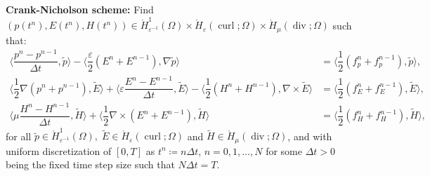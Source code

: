 \documentclass{amsart}
\theoremstyle{thmstyleone}%
\theoremstyle{thmstyletwo}%
\theoremstyle{thmstylethree}%
\DeclareMathOperator{\curl}{curl}
\def\divgn{\operatorname{div}}
\newcommand{\aInnerproduct}[2]{\bigl\langle #1, #2 \bigr\rangle}
\begin{document}
\smallskip \noindent \textbf{Crank-Nicholson scheme:} Find $(p(t^n), E(t^n), H(t^n)) \in \mathring{H}^1_{\varepsilon^{-1}}(\Omega) \times \mathring{H}_{\varepsilon}(\curl; \Omega) \times \mathring{H}_{\mu}(\divgn; \Omega)$ such that:
\begin{subequations}
  \begin{align}
    \aInnerproduct{\dfrac{p^n - p^{n - 1}}{\Delta t}}{\widetilde{p}} - \aInnerproduct{\dfrac{\varepsilon}{2} \left(  E^n +  E^{n - 1} \right)}{\nabla \widetilde{p}} &= \aInnerproduct{\dfrac{1}{2} \left( f_p^n + f_p^{n - 1} \right)}{\widetilde{p}},\label{eqn:maxwell_p_cn} \\
    \aInnerproduct{\dfrac{1}{2} \nabla \left( p^n + p^{n - 1} \right)}{\widetilde{E}} + \aInnerproduct{\varepsilon \dfrac{E^n - E^{n - 1}}{\Delta t}}{\widetilde{E}} - \aInnerproduct{\dfrac{1}{2} \left( H^n + H^{n - 1} \right)}{\nabla \times \widetilde{E}} &= \aInnerproduct{\dfrac{1}{2} \left(f_E^n + f_E^{n - 1} \right)}{\widetilde{E}}, \label{eqn:maxwell_E_cn}\\
    \aInnerproduct{\mu \dfrac{H^n - H^{n - 1}}{\Delta t}}{\widetilde{H}} + \aInnerproduct{\dfrac{1}{2} \nabla \times \left( E^n + E^{n - 1} \right)}{\widetilde{H}} &= \aInnerproduct{\dfrac{1}{2} \left( f_H^n + f_H^{n - 1} \right)}{\widetilde{H}}, \label{eqn:maxwell_H_cn}
  \end{align}
\end{subequations}
for all $\widetilde{p} \in \mathring{H}^1_{\varepsilon^{-1}}(\Omega), \; \widetilde{E} \in \mathring{H}_{\varepsilon}(\curl; \Omega)$ and $\widetilde{H} \in \mathring{H}_{\mu}(\divgn; \Omega)$, and with uniform discretization of $[0, T]$ as $t^n \coloneq n \Delta t$, $n = 0, 1, \dots, N$ for some $\Delta t > 0$ being the fixed time step size such that $N \Delta t = T$.
\end{document}
